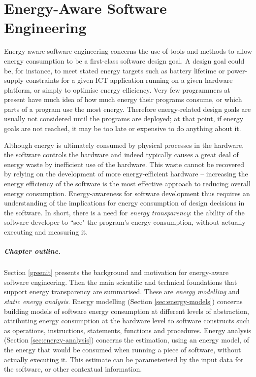 \documentclass[oneside]{book}
\begin{document}
\chapter{Energy-Aware Software Engineering}

Energy-aware software engineering concerns the use of tools and methods to allow energy consumption to be a first-class software design goal. A design goal could be, for instance, to meet stated energy targets such as battery lifetime or power-supply constraints for a given ICT application running on a given hardware platform, or simply to optimise energy efficiency. Very few programmers at present have much idea of how much energy their programs consume, or which parts of a program use the most energy. Therefore energy-related design goals are usually not considered until the programs are deployed; at that point, if energy goals are not reached, it may be too late or expensive to do anything about it. 


Although energy is ultimately consumed by physical processes in the hardware, the software controls the hardware and indeed typically causes a great deal of energy waste by inefficient use of the hardware. This waste cannot be recovered by relying on the development of more energy-efficient hardware -- increasing the energy efficiency of the software is the most effective approach to reducing overall energy consumption.  Energy-awareness for software development thus requires an understanding of the implications for energy consumption of design decisions in the software. In short, there is a need for \emph{energy transparency}: the ability of the software developer to ``see" the program's energy consumption, without actually executing and measuring it. 

\paragraph{Chapter outline.}  Section \ref{greenit} presents the background and motivation for energy-aware software engineering. Then  the main scientific and technical foundations that support energy transparency are summarised.  These are \emph{energy modelling} and \emph{static energy analysis}. Energy modelling (Section \ref{sec:energy-models}) concerns building models of software energy consumption at different levels of abstraction, attributing energy consumption at the hardware level to software constructs such as operations, instructions, statements, functions and
procedures.   Energy analysis (Section \ref{sec:energy-analysis}) concerns the estimation, using an energy model, of the energy that would be consumed when running a piece of software, without actually executing it.  This estimate can be parameterised by the input data for the software, or other contextual information. 
\end{document}
